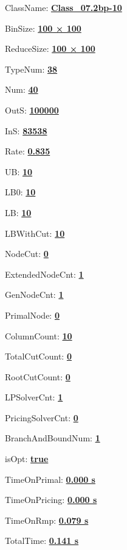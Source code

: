 \documentclass[11pt]{article}
\begin{document}
\pagestyle{empty}


ClassName: \underline{\textbf{Class_07.2bp-10}}
\par
BinSize: \underline{\textbf{100 × 100}}
\par
ReduceSize: \underline{\textbf{100 × 100}}
\par
TypeNum: \underline{\textbf{38}}
\par
Num: \underline{\textbf{40}}
\par
OutS: \underline{\textbf{100000}}
\par
InS: \underline{\textbf{83538}}
\par
Rate: \underline{\textbf{0.835}}
\par
UB: \underline{\textbf{10}}
\par
LB0: \underline{\textbf{10}}
\par
LB: \underline{\textbf{10}}
\par
LBWithCut: \underline{\textbf{10}}
\par
NodeCut: \underline{\textbf{0}}
\par
ExtendedNodeCnt: \underline{\textbf{1}}
\par
GenNodeCnt: \underline{\textbf{1}}
\par
PrimalNode: \underline{\textbf{0}}
\par
ColumnCount: \underline{\textbf{10}}
\par
TotalCutCount: \underline{\textbf{0}}
\par
RootCutCount: \underline{\textbf{0}}
\par
LPSolverCnt: \underline{\textbf{1}}
\par
PricingSolverCnt: \underline{\textbf{0}}
\par
BranchAndBoundNum: \underline{\textbf{1}}
\par
isOpt: \underline{\textbf{true}}
\par
TimeOnPrimal: \underline{\textbf{0.000 s}}
\par
TimeOnPricing: \underline{\textbf{0.000 s}}
\par
TimeOnRmp: \underline{\textbf{0.079 s}}
\par
TotalTime: \underline{\textbf{0.141 s}}
\par
\newpage


\end{document}
